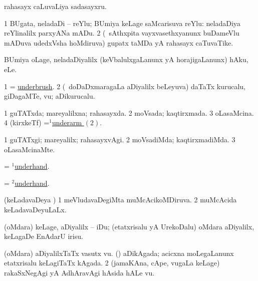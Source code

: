 \noindent
\gl{\pagu}
\expl{}
\bmng
  rahasayx caLuvaLiya sadasayxru. 
\emng
\eentry

\bentry
{} 
\gl{\nA}
\expl{}
\bmng
\bnum
\num{1} BUgata, neladaDi -- reYlu; BUmiya keLage saMcarisuva reYlu:  neladaDiya reYlinalilx parxyANa mADu. 
\num{2} (\kanmu\ sAthxpita vayxvasethxyanunx buDameVlu mADuva udedxVsha hoMdiruva) gupatx taMDa yA rahasayx caTuvaTike. 
\enum
\emng
\eentry

\bentry
{} 
\gl{\sakirx}
\expl{}
\bmng
 BUmiya oLage, neladaDiyalilx (keVbalulxgaLanunx yA horajigaLanunx) hAku, eLe. 
\emng
\eentry

\bentry
{} 
\gl{\nA}
\expl{}
\bmng
\bnum
\num{1} = \hyperlink{underbrush}{underbrush}. 
\num{2} (\kanmu\ doDaDxmaragaLa aDiyalilx beLeyuva) daTaTx kurucalu, giDagaMTe, \mo vu; aDikurucalu. 
\enum
\emng
\eentry

\bentry
{} 
\gl{\gu}
\expl{}
\bmng
\bnum
\num{1} guTATxda; mareyalilxna; rahasayxda. 
\num{2} moVsada; kaqtirxmada. 
\num{3} oLasaMcina. 
\num{4} (kirxkeTf) =\hyperlink{underarm(1)2}{$^1$underarm \((2)\)}.  
\enum
\emng
\eentry

\bentry
{} 
\gl{\kirxvi}
\expl{}
\bmng
\bnum
\num{1} guTATxgi; mareyalilx; rahasayxvAgi. 
\num{2} moVsadiMda; kaqtirxmadiMda. 
\num{3} oLasaMcinaMte. 
\enum
\emng
\eentry

\bentry
{} 
\gl{\gu}
\expl{}
\bmng
 = \hyperlink{underhand(1)}{$^1$underhand}. 
\emng
\eentry

\bentry
{} 
\gl{\kirxvi}
\expl{}
\bmng
 = \hyperlink{underhand(2)}{$^2$underhand}. 
\emng
\eentry

\bentry
{} 
\gl{\gu}
\expl{}
\bmng
 (keLadavaDeya \vi) 
\bnum
\num{1} meVludavaDegiMta muMcAcikoMDiruva. 
\num{2} muMcAcida keLadavaDeyuLaLx. 
\enum
\emng
\eentry

\bentry
{} 
\gl{\sakirx}
\bmng
 (oMdara) keLage, aDiyalilx -- iDu; (etatxrisalu yA UrekoDalu) oMdara aDiyalilx, keLagaDe EnAdarU irisu. 
\emng
\eentry

\bentry
{} 
\gl{\nA}
\expl{}
\bmng
\bnum
{} 
\banum
{} (oMdara) aDiyalilxTaTx vasutx \mo vu. 
 (\kanmu) aDikAgada; acicxna moLegaLanunx etatxrisalu keLagiTaTx kAgada. 
\eanum
\numie
\num{2} (jamaKAna, cApe, \mo vugaLa keLage) rakaSxNegAgi yA AdhAravAgi hAsida hALe \mo vu. 
\enum
\emng
\eentry

